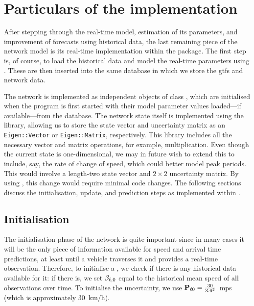 \section{Particulars of the \rt{} implementation}
\label{sec:nw_implementation}

After stepping through the real-time model, estimation of its parameters, and improvement of forecasts using historical data, the last remaining piece of the network model is its real-time implementation within the  package. The first step is, of course, to load the historical data and model the real-time parameters using . These are then inserted into the same database in which we store the \gls{gtfs} and network data.


The network is implemented as independent objects of class , which are initialised when the program is first started with their model parameter values loaded---if available---from the database. The network state itself is implemented using the  \Cpp{} library, allowing us to store the state vector and uncertainty matrix as an \verb+Eigen::Vector+ or \verb+Eigen::Matrix+, respectively. This library includes all the necessary vector and matrix operations, for example, multiplication. Even though the current state is one-dimensional, we may in future wish to extend this to include, say, the rate of change of speed, which could better model peak periods. This would involve a length-two state vector and $2\times2$ uncertainty matrix. By using , this change would require minimal code changes. The following sections discuss the initialisation, update, and prediction steps as implemented within .


\subsection{Initialisation}
\label{sec:nw_implementation_init}

The initialisation phase of the network is quite important since in many cases it will be the only piece of information available for speed and arrival time predictions, at least until a vehicle traverses it and provides a real-time observation. Therefore, to initialise a , we check if there is any historical data available for it: if there is, we set $\beta_{\ell,0}$ equal to the historical mean speed of all observations over time. To initialise the uncertainty, we use $\mathbf{P}_{\ell 0} = \frac{30}{3.6^2}$~\gls{mps} (which is approximately 30~km/h).

